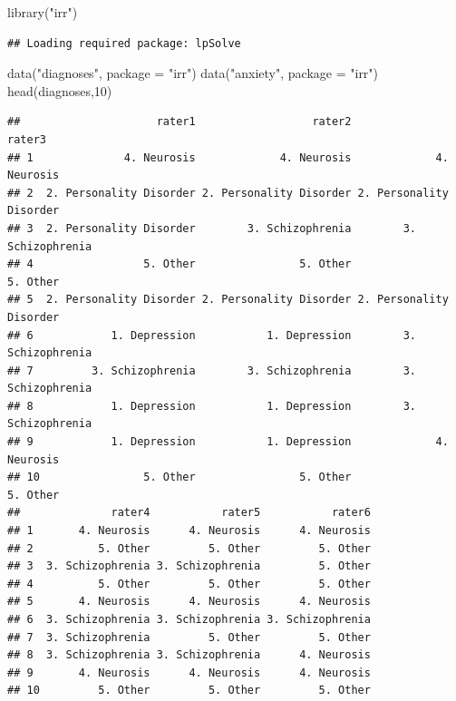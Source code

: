 \documentclass[
]{book}
\newenvironment{Shaded}{\begin{snugshade}}{\end{snugshade}}
\newcommand{\AttributeTok}[1]{\textcolor[rgb]{0.77,0.63,0.00}{#1}}
\newcommand{\DecValTok}[1]{\textcolor[rgb]{0.00,0.00,0.81}{#1}}
\newcommand{\FunctionTok}[1]{\textcolor[rgb]{0.00,0.00,0.00}{#1}}
\newcommand{\NormalTok}[1]{#1}
\newcommand{\StringTok}[1]{\textcolor[rgb]{0.31,0.60,0.02}{#1}}
\begin{document}
\begin{Shaded}
\begin{Highlighting}[]
\FunctionTok{library}\NormalTok{(}\StringTok{"irr"}\NormalTok{)}
\end{Highlighting}
\end{Shaded}

\begin{verbatim}
## Loading required package: lpSolve
\end{verbatim}

\begin{Shaded}
\begin{Highlighting}[]
\FunctionTok{data}\NormalTok{(}\StringTok{"diagnoses"}\NormalTok{, }\AttributeTok{package =} \StringTok{"irr"}\NormalTok{)}
\FunctionTok{data}\NormalTok{(}\StringTok{"anxiety"}\NormalTok{, }\AttributeTok{package =} \StringTok{"irr"}\NormalTok{)}
\FunctionTok{head}\NormalTok{(diagnoses,}\DecValTok{10}\NormalTok{)}
\end{Highlighting}
\end{Shaded}

\begin{verbatim}
##                     rater1                  rater2                  rater3
## 1              4. Neurosis             4. Neurosis             4. Neurosis
## 2  2. Personality Disorder 2. Personality Disorder 2. Personality Disorder
## 3  2. Personality Disorder        3. Schizophrenia        3. Schizophrenia
## 4                 5. Other                5. Other                5. Other
## 5  2. Personality Disorder 2. Personality Disorder 2. Personality Disorder
## 6            1. Depression           1. Depression        3. Schizophrenia
## 7         3. Schizophrenia        3. Schizophrenia        3. Schizophrenia
## 8            1. Depression           1. Depression        3. Schizophrenia
## 9            1. Depression           1. Depression             4. Neurosis
## 10                5. Other                5. Other                5. Other
##              rater4           rater5           rater6
## 1       4. Neurosis      4. Neurosis      4. Neurosis
## 2          5. Other         5. Other         5. Other
## 3  3. Schizophrenia 3. Schizophrenia         5. Other
## 4          5. Other         5. Other         5. Other
## 5       4. Neurosis      4. Neurosis      4. Neurosis
## 6  3. Schizophrenia 3. Schizophrenia 3. Schizophrenia
## 7  3. Schizophrenia         5. Other         5. Other
## 8  3. Schizophrenia 3. Schizophrenia      4. Neurosis
## 9       4. Neurosis      4. Neurosis      4. Neurosis
## 10         5. Other         5. Other         5. Other
\end{verbatim}
\end{document}
